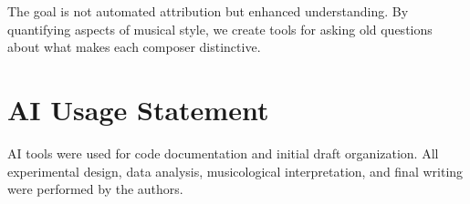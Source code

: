 \documentclass{article}
\begin{document}
The goal is not automated attribution but enhanced understanding. By quantifying aspects of musical style, we create tools for asking old questions about what makes each composer distinctive.

\section{AI Usage Statement}

AI tools were used for code documentation and initial draft organization. All experimental design, data analysis, musicological interpretation, and final writing were performed by the authors.



\end{document}
